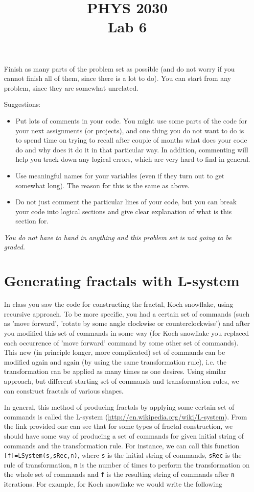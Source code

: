 \documentclass[letterpaper]{article}
\title{PHYS 2030 \\Lab 6}
\begin{document}
\maketitle
Finish as many parts of the problem set as possible (and do not worry if you cannot finish all of them, since there is a lot to do). You can start from any problem, since they are somewhat unrelated.

Suggestions: 
\begin{itemize}
\item Put lots of comments in your code. You might use some parts of the code for your next assignments (or projects), and one thing you do not want to do is to spend time on trying to recall after couple of months what does your code do and why does it do it in that particular way. In addition, commenting will help you track down any logical errors, which are very hard to find in general.
\item  Use meaningful names for your variables (even if they turn out to get somewhat long). The reason for this is the same as above.
\item Do not just comment the particular lines of your code, but you can break your code into logical sections and give clear explanation of what is this section for.
\end{itemize}

\emph{You do not have to hand in anything and this problem set is not going to be graded.} 

\section{Generating fractals with L-system}
In class you saw the code for constructing the fractal, Koch snowflake, using recursive approach. To be more specific, you had a certain set of commands (such as 'move forward', 'rotate by some angle clockwise or counterclockwise') and after you modified this set of commands in some way (for Koch snowflake you replaced each occurrence of 'move forward' command by some other set of commands). This new (in principle longer, more complicated) set of commands can be modified again and again (by using the same transformation rule), i.e. the transformation can be applied as many times as one desires. Using similar approach, but different starting set of commands and transformation rules, we can construct fractals of various shapes.

In general, this method of producing fractals by applying some certain set of commands is called the L-system (\url{http://en.wikipedia.org/wiki/L-system}). From the link provided one can see that for some types of fractal construction, we should have some way of producing a set of commands for given initial string of commands and the transformation rule. 
For instance, we can call this function \verb|[f]=LSystem(s,sRec,n)|, where \verb|s| is the initial string of commands, \verb|sRec| is the rule of transformation, \verb|n| is the number of times to perform the transformation on the whole set of commands and \verb|f| is the resulting string of commands after \verb|n| iterations. For example, for Koch snowflake we would write the following\\
\end{document}
